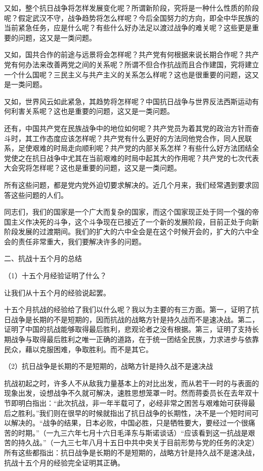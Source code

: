 \documentclass[UTF8, 12pt, a4paper]{ctexrep}
\begin{document}
又如，整个抗日战争将怎样发展变化呢？所谓新阶段，究将是一种什么性质的阶段呢？假定武汉不守，战争趋势将怎么样呢？今后全国努力的方向，即全中华民族的当前紧急任务，应是什么呢？有些什么好办法足以渡过战争的难关呢？这些更是重要的问题，这又是一类问题。

又如，国共合作的前途与远景将会怎样呢？共产党有何根据来说长期合作呢？共产党有何办法来改善两党之间的关系呢？所谓不但合作抗战而且合作建国，究将建立一个什么国呢？三民主义与共产主义的关系怎么样呢？这也是很重要的问题，这又是一类问题。

又如，世界风云如此紧急，其趋势将怎样呢？中国抗日战争与世界反法西斯运动有何利害关系呢？这也是重要的问题，这又是一类问题。

还有，中国共产党在民族战争中的地位如何呢？共产党员为着其党的政治方针而奋斗时，其工作态度应该怎样呢？共产党有什么更好的方法同他党合作，同人民联系，足使艰难的时局走向顺利呢？共产党的内部关系怎样？有些什么好方法团结全党使之在抗日战争中尤其在当前艰难的时局中起其大的作用呢？共产党的七次代表大会究将怎样呢？这也是重要的问题，这又是一类问题。

所有这些问题，都是党内党外迫切要求解决的。近几个月来，我们经常遇到要求回答这些问题的人们。

同志们，我们的国家是一个广大而复杂的国家，而这个国家现正处于同一个强的帝国主义作决死的斗争，这个斗争现在已接近了一个新的发展阶段，目前正处于向新阶段发展的过渡期间。我们的扩大的六中全会是在这个时候开会的，扩大的六中全会的责任非常重大，我们要解决许多的问题。

二、抗战十五个月的总结

（1）十五个月经验证明了什么？

让我们从十五个月的经验说起罢。

十五个月抗战的经验给了我们以什么呢？我以为主要的有三方面。第一，证明了抗日战争是长期的不是短期的，因而抗战的战略方针是持久战而不是速决战。第二，证明了中国的抗战能够取得最后胜利，悲观论者之没有根据。第三，证明了支持长期战争与取得最后胜利之唯一正确的道路，在于统一团结全民族，力求进步与依靠民众，藉以克服困难，争取胜利。而不是其它。

（2）抗日战争是长期的不是短期的，战略方针是持久战不是速决战

抗战初起之时，许多人不从敌我力量基本上的对比出发，而从若干一时的与表面的现象出发，设想战争不久就可解决，速胜思想笼罩一时。然而蒋委员长在去年双十节即明白指出：“此次抗战，非一年半载可了，必经非常之困苦与艰难始可获得最后之胜利。”我们则在很早的时候就指出了抗日战争的长期性，决不是一个短时间可以解决的。“战争的结果，日本必败，中国必胜，只是牺牲要大，要经过一个很痛苦的时期。”（一九三六年七月十六日毛泽东与斯诺谈话）“应该看到这一抗战是艰苦的持久战。”（一九三七年八月十五日中共中央关于目前形势与党的任务的决定）所有这些都指出：抗日战争是长期的不是短期的，战略方针是持久战不是速决战，抗战十五个月的经验完全证明其正确。
\end{document}
